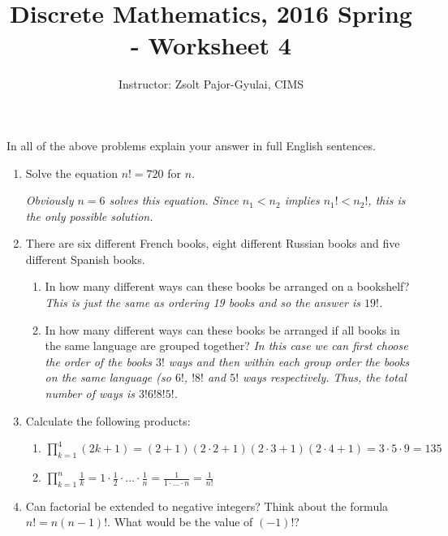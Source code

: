 \documentclass[11pt]{preprint}
\title{Discrete Mathematics, 2016 Spring - Worksheet 4}
\author{Instructor: Zsolt Pajor-Gyulai, CIMS}
\begin{document}
\maketitle

In all of the above problems explain your answer in full English sentences.

\begin{enumerate}

\item Solve the equation $n!=720$ for $n$.

\vspace{0.2cm}
\textit{Obviously $n=6$ solves this equation. Since $n_1<n_2$ implies $n_1!<n_2!$, this is the only possible solution.}
\vspace{0.2cm}

\item There are six different French books, eight different Russian books and five different Spanish books.

\begin{enumerate}
\item In how many different ways can these books be arranged on a bookshelf?
\vspace{0.2cm}
\textit{This is just the same as ordering 19 books and so the answer is $19!$.}
\vspace{0.2cm}
\item In how many different ways can these books be arranged if all books in the same language are grouped together?
\vspace{0.2cm}
\textit{In this case we can first choose the order of the books $3!$ ways and then within each group order the books on the same language (so $6!$, $!8!$ and $5!$ ways respectively. Thus, the total number of ways is $3!6!8!5!$.}


\vspace{0.2cm}
\end{enumerate}


\item Calculate the following products:
\begin{enumerate}
\item $\prod_{k=1}^4(2k+1)=(2+1)(2\cdot 2+1)(2\cdot 3+1)(2\cdot 4+1)=3\cdot5\cdot9=135$
\item $\prod_{k=1}^n\frac{1}{k}=1\cdot\frac{1}{2}\cdot...\cdot\frac{1}{n}=\frac{1}{1\cdot...\cdot n}=\frac{1}{n!}$
\end{enumerate}

\item Can factorial be extended to negative integers? Think about the formula $n!=n(n-1)!$. What would be the value of $(-1)!$?


\end{enumerate}
\end{document}
